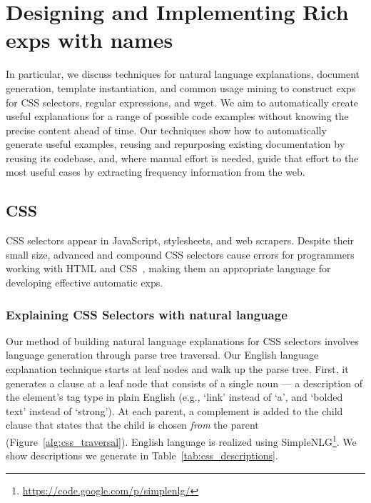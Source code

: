 \section{Designing and Implementing Rich \Glspl{exp} with \Glspl{name}}

In particular, we discuss techniques for natural language explanations, document generation, template instantiation, and common usage mining to construct \glspl{exp} for CSS selectors, regular expressions, and wget.
We aim to automatically create useful explanations for a range of possible code examples without knowing the precise content ahead of time. 
 Our techniques show how to automatically generate useful examples, reusing and repurposing existing documentation by reusing its codebase, and, where manual effort is needed, guide that effort to the most useful cases by extracting frequency information from the web. \fi

\subsection{CSS}

CSS selectors appear in JavaScript, stylesheets, and web scrapers.
Despite their small size, advanced and compound CSS selectors cause errors for programmers working with HTML and CSS~\cite{park_towards_2013}, making them an appropriate language for developing effective automatic \glspl{exp}.

\subsubsection{Explaining CSS Selectors with natural language}

Our method of building natural language explanations for CSS selectors involves language generation through parse tree traversal.
Our English language explanation technique starts at leaf nodes and walk up the parse tree.
First, it generates a clause at a leaf node that consists of a single noun --- a description of the element's tag type in plain English (e.g., `link' instead of `a', and `bolded text' instead of `strong').
At each parent, a complement is added to the child clause that states that the child is chosen \emph{from} the parent (Figure~\ref{alg:css_traversal}).
English language is realized using SimpleNLG\footnote{\url{https://code.google.com/p/simplenlg/}}.
We show descriptions we generate in Table~\ref{tab:css_descriptions}.

